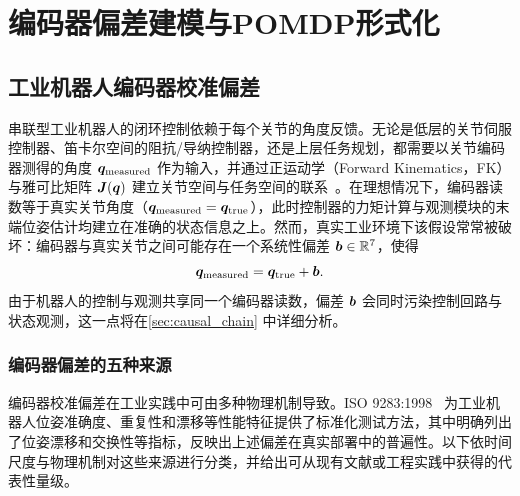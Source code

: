 
\chapter{编码器偏差建模与POMDP形式化}\label{ch:problem_formulation}

\section{工业机器人编码器校准偏差}\label{sec:bias_sources}

串联型工业机器人的闭环控制依赖于每个关节的角度反馈。无论是低层的关节伺服控制器、笛卡尔空间的阻抗/导纳控制器，还是上层任务规划，都需要以关节编码器测得的角度 $\bm{q}_{\text{measured}}$ 作为输入，并通过正运动学（Forward Kinematics，FK）与雅可比矩阵 $\bm{J}(\bm{q})$ 建立关节空间与任务空间的联系~\cite{siciliano2010robotics}。在理想情况下，编码器读数等于真实关节角度（$\bm{q}_{\text{measured}} = \bm{q}_{\text{true}}$），此时控制器的力矩计算与观测模块的末端位姿估计均建立在准确的状态信息之上。然而，真实工业环境下该假设常常被破坏：编码器与真实关节之间可能存在一个系统性偏差 $\bm{b} \in \mathbb{R}^7$，使得
\begin{equation}
  \bm{q}_{\text{measured}} = \bm{q}_{\text{true}} + \bm{b}.
  \label{eq:encoder_bias}
\end{equation}
由于机器人的控制与观测共享同一个编码器读数，偏差 $\bm{b}$ 会同时污染控制回路与状态观测，这一点将在\cref{sec:causal_chain} 中详细分析。

\subsection*{编码器偏差的五种来源}

编码器校准偏差在工业实践中可由多种物理机制导致。ISO 9283:1998~\cite{iso9283} 为工业机器人位姿准确度、重复性和漂移等性能特征提供了标准化测试方法，其中明确列出了位姿漂移和交换性等指标，反映出上述偏差在真实部署中的普遍性。以下依时间尺度与物理机制对这些来源进行分类，并给出可从现有文献或工程实践中获得的代表性量级。

